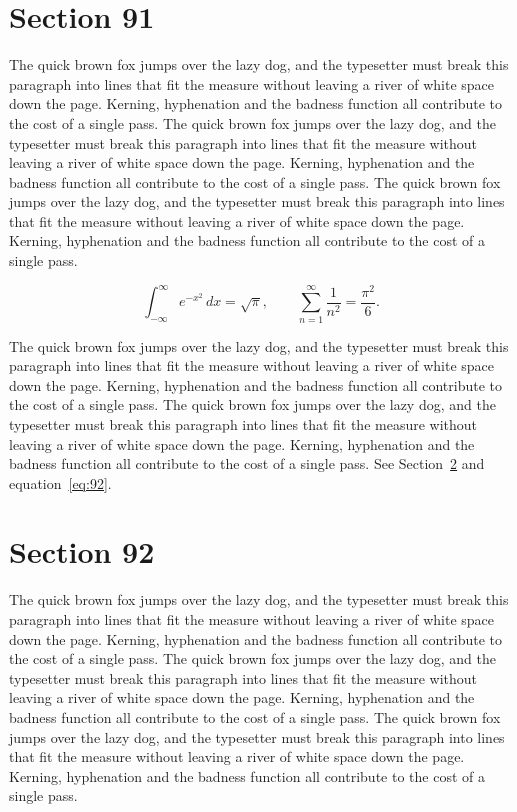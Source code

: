 \documentclass{article}
\begin{document}
\section{Section 91}
\label{sec:91}
The quick brown fox jumps over the lazy dog, and the typesetter must break this paragraph into lines that fit the measure without leaving a river of white space down the page. Kerning, hyphenation and the badness function all contribute to the cost of a single pass. The quick brown fox jumps over the lazy dog, and the typesetter must break this paragraph into lines that fit the measure without leaving a river of white space down the page. Kerning, hyphenation and the badness function all contribute to the cost of a single pass. The quick brown fox jumps over the lazy dog, and the typesetter must break this paragraph into lines that fit the measure without leaving a river of white space down the page. Kerning, hyphenation and the badness function all contribute to the cost of a single pass. 

\begin{equation}\label{eq:91}
\int_{-\infty}^{\infty} e^{-x^{2}}\,dx = \sqrt{\pi}, \qquad
\sum_{n=1}^{\infty} \frac{1}{n^{2}} = \frac{\pi^{2}}{6}.
\end{equation}

The quick brown fox jumps over the lazy dog, and the typesetter must break this paragraph into lines that fit the measure without leaving a river of white space down the page. Kerning, hyphenation and the badness function all contribute to the cost of a single pass. The quick brown fox jumps over the lazy dog, and the typesetter must break this paragraph into lines that fit the measure without leaving a river of white space down the page. Kerning, hyphenation and the badness function all contribute to the cost of a single pass. 
See Section~\ref{sec:92} and equation~\eqref{eq:92}.
\section{Section 92}
\label{sec:92}
The quick brown fox jumps over the lazy dog, and the typesetter must break this paragraph into lines that fit the measure without leaving a river of white space down the page. Kerning, hyphenation and the badness function all contribute to the cost of a single pass. The quick brown fox jumps over the lazy dog, and the typesetter must break this paragraph into lines that fit the measure without leaving a river of white space down the page. Kerning, hyphenation and the badness function all contribute to the cost of a single pass. The quick brown fox jumps over the lazy dog, and the typesetter must break this paragraph into lines that fit the measure without leaving a river of white space down the page. Kerning, hyphenation and the badness function all contribute to the cost of a single pass. 
\end{document}
